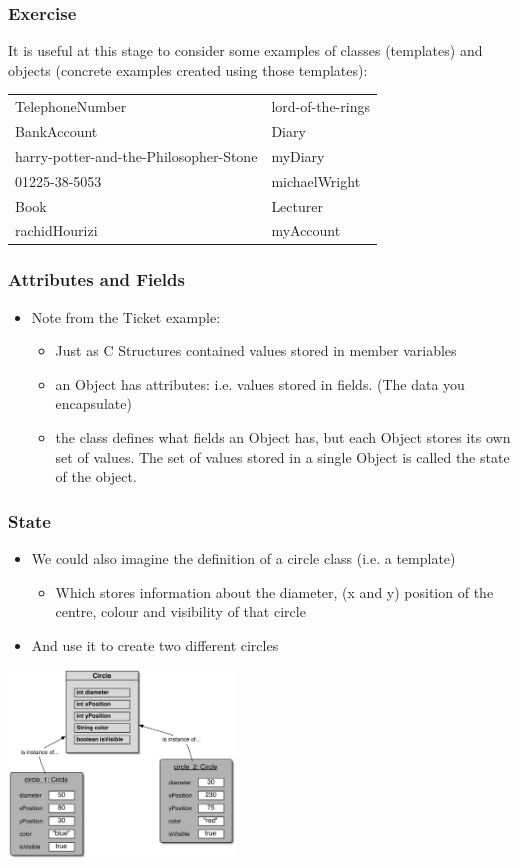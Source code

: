 \documentclass{beamer}
\begin{document}
\begin{frame}
\frametitle{Exercise}
It is useful at this stage to consider some examples of classes (templates) and objects (concrete examples created using those templates):
\begin{tabular}{ll}
TelephoneNumber & lord-of-the-rings \\
BankAccount & Diary\\
harry-potter-and-the-Philosopher-Stone  & myDiary\\
01225-38-5053 & michaelWright\\
Book & Lecturer\\
rachidHourizi & myAccount\\
\end{tabular}
\end{frame}

\begin{frame}
\frametitle{Attributes and Fields}
\begin{itemize}
\item Note from the Ticket example:
\begin{itemize}
\item Just as C Structures contained values stored in member variables
\item an Object has \alert{attributes}: i.e. \alert{values} stored in \alert{fields}. (The data you encapsulate)
\item the class defines what fields an Object has, but each Object stores its own set of values.
The set of values stored in a single Object is called the \alert{state} of the object.
\end{itemize}
\end{itemize}
\end{frame}

\begin{frame}
\frametitle{State}
\begin{itemize}
\item We could also imagine the definition of a circle class (i.e. a template)
\begin{itemize}
\item Which stores information about the diameter, (x and y) position of the centre, colour and visibility of that circle
\end{itemize}
\item And use it to create two different circles
\end{itemize}
\begin{center}
\includegraphics[height=5cm,keepaspectratio]{./figures/state}
\end{center}
\end{frame}
\end{document}
